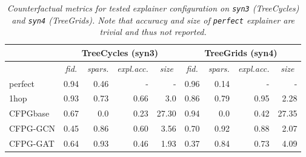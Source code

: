 \documentclass[binding=0.6cm]{sapthesis}
\begin{document}
\begin{table}
    \centering
    \begin{tabular}{lrrrrrrrr}
        \hline
                 & \multicolumn{4}{c}{TreeCycles (syn3)} & \multicolumn{4}{c}{TreeGrids (syn4)} \\ 
        \hline
         &
          \multicolumn{1}{|c}{\textit{fid.}} & \multicolumn{1}{c}{\textit{spars.}} & \multicolumn{1}{c}{\textit{expl.acc.}} & \multicolumn{1}{c|}{\textit{size}} & 
          \multicolumn{1}{c}{\textit{fid.}} & \multicolumn{1}{c}{\textit{spars.}} & \multicolumn{1}{c}{\textit{expl.acc.}} & \multicolumn{1}{c}{\textit{size}} \\ 
        \hline
        perfect  & 0.94   & 0.46   & -       & -       & 0.96     & 0.14    & -       & -      \\
        1hop     & 0.93   & 0.73   & 0.66    & 3.0     & 0.86     & 0.79    & 0.95    & 2.28   \\
        \hline
        CFPGbase & 0.67   & 0.0    & 0.23    & 27.30   & 0.94     & 0.0     & 0.42    & 27.35  \\
        CFPG-GCN & 0.45   & 0.86   & 0.60    & 3.56    & 0.70     & 0.92    & 0.88    & 2.07   \\
        CFPG-GAT & 0.64   & 0.93   & 0.46    & 1.93    & 0.37     & 0.84    & 0.73    & 4.09   \\
        \hline
    \end{tabular}
    \caption{\textit{Counterfactual metrics for tested explainer configuration on \texttt{syn3} (TreeCycles) and \texttt{syn4} (TreeGrids). Note that accuracy and size of \texttt{perfect} explainer are trivial and thus not reported.}}
    \label{tab:expRes.syn3-4}
\end{table}
\end{document}
